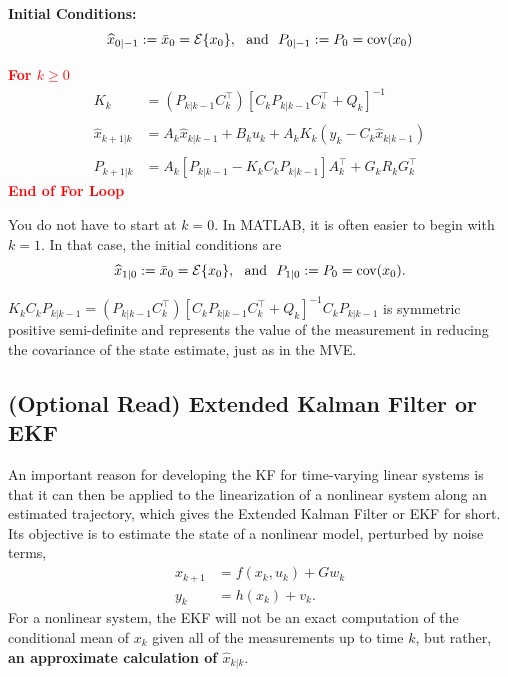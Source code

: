 \textbf{Initial Conditions:}
$$\widehat{x}_{0|-1} :=\bar{x}_0 = {\cal E} \{ x_0 \},~~\mbox{and}~~P_{0|-1}:=P_0=\mathrm{cov}(x_0)  $$

\textcolor{red}{\bf For $k \ge 0$}
\begin{align*}
K_k & = (P_{k|k-1} C_k^\top) \left[ C_k P_{k|k-1} C_k^\top + Q_k \right]^{-1}\\
& \\
\widehat{x}_{k+1|k}&= A_k \widehat{x}_{k|k-1} + B_k u_k + A_k K_k \left( y_k - C_k   \widehat{x}_{k|k-1} \right) \\
& \\
P_{k+1|k} &= A_k \left[ P_{k|k-1} - K_k C_k P_{k|k-1} \right] A_k ^\top + G_k R_k G_k^\top
\end{align*}
\textcolor{red}{\bf End of For Loop}\\


\begin{rem} You do not have to start at $k=0$. In MATLAB, it is often easier to begin with $k=1$. In that case, the initial conditions are
$$\widehat{x}_{1|0} :=\bar{x}_0 = {\cal E} \{ x_0 \},~~\mbox{and}~~P_{1|0}:=P_0=\mathrm{cov}(x_0).  $$
\end{rem} 

\begin{rem} $ K_k C_k P_{k|k-1} =  (P_{k|k-1} C_k^\top) \left[ C_k P_{k|k-1} C_k^\top + Q_k \right]^{-1}C_k P_{k|k-1}$ is symmetric positive semi-definite and represents the value of the measurement in reducing the covariance of the state estimate, just as in the MVE.
\end{rem} 

\subsection{(Optional Read) Extended Kalman Filter or EKF}

 An important reason for developing the KF for time-varying linear systems is that it can then be applied to the linearization of a nonlinear system along an estimated trajectory, which gives the Extended Kalman Filter or EKF for short. Its objective is to estimate the state of a nonlinear model, perturbed by noise terms,
\begin{align*}
x_{k+1} &= f(x_k,u_k)+Gw_k \\
y_k &= h(x_k)+v_k.
\end{align*}
For a nonlinear system, the EKF will not be an exact computation of the conditional mean of $x_k$ given all of the measurements up to time $k$, but rather, \textbf{an approximate calculation of $\widehat{x}_{k|k}$}.\\


